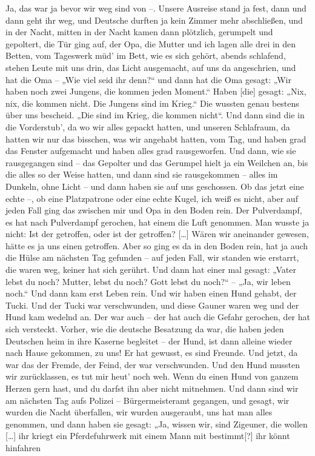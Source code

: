 \documentclass[ngerman,]{article}
\begin{document}
\begin{multicols}{3}
\begin{description}
Ja, das war ja bevor wir weg sind von –. Unsere Ausreise stand ja fest,
dann und dann geht ihr weg, und Deutsche durften ja kein Zimmer mehr
abschließen, und in der Nacht, mitten in der Nacht kamen dann plötzlich,
gerumpelt und gepoltert, die Tür ging auf, der Opa, die Mutter und ich
lagen alle drei in den Betten, vom Tageswerk müd' im Bett, wie es sich
gehört, abends schlafend, stehen Leute mit uns drin, das Licht
ausgemacht, auf uns da angeschrien, und hat die Oma – „Wie viel seid ihr
denn?“ und dann hat die Oma gesagt: „Wir haben noch zwei Jungens, die
kommen jeden Moment.“ Haben {[}die{]} gesagt: „Nix, nix, die kommen
nicht. Die Jungens sind im Krieg.“ Die wussten genau bestens über uns
bescheid. „Die sind im Krieg, die kommen nicht“. Und dann sind die in
die Vorderstub', da wo wir alles gepackt hatten, und unseren Schlafraum,
da hatten wir nur das bisschen, was wir angehabt hatten, vom Tag, und
haben grad das Fenster aufgemacht und haben alles grad rausgeworfen. Und
dann, wie sie rausgegangen sind – das Gepolter und das Gerumpel hielt ja
ein Weilchen an, bis die alles so der Weise hatten, und dann sind sie
rausgekommen – alles im Dunkeln, ohne Licht – und dann haben sie auf uns
geschossen. Ob das jetzt eine echte –, ob eine Platzpatrone oder eine
echte Kugel, ich weiß es nicht, aber auf jeden Fall ging das zwischen
mir und Opa in den Boden rein. Der Pulverdampf, es hat nach Pulverdampf
gerochen, hat einem die Luft genommen. Man wusste ja nicht: Ist der
getroffen, oder ist der getroffen? {[}\ldots{}{]} Wären wir aneinander
gewesen, hätte es ja uns einen getroffen. Aber so ging es da in den
Boden rein, hat ja auch die Hülse am nächsten Tag gefunden – auf jeden
Fall, wir standen wie erstarrt, die waren weg, keiner hat sich gerührt.
Und dann hat einer mal gesagt: „Vater lebst du noch? Mutter, lebst du
noch? Gott lebst du noch?“ – „Ja, wir leben noch.“ Und dann kam erst
Leben rein. Und wir haben einen Hund gehabt, der Tucki. Und der Tucki
war verschwunden, und diese Gauner waren weg und der Hund kam wedelnd
an. Der war auch – der hat auch die Gefahr gerochen, der hat sich
versteckt. Vorher, wie die deutsche Besatzung da war, die haben jeden
Deutschen heim in ihre Kaserne begleitet – der Hund, ist dann alleine
wieder nach Hause gekommen, zu uns! Er hat gewusst, es sind Freunde. Und
jetzt, da war das der Fremde, der Feind, der war verschwunden. Und den
Hund mussten wir zurücklassen, es tut mir heut' noch weh. Wenn du einen
Hund von ganzem Herzen gern hast, und du darfst ihn aber nicht
mitnehmen. Und dann sind wir am nächsten Tag aufs Polizei –
Bürgermeisteramt gegangen, und gesagt, wir wurden die Nacht überfallen,
wir wurden ausgeraubt, uns hat man alles genommen, und dann haben sie
gesagt: „Ja, wissen wir, sind Zigeuner, die wollen {[}\ldots{}{]} ihr
kriegt ein Pferdefuhrwerk mit einem Mann mit bestimmt{[}?{]} ihr könnt
hinfahren
\end{description}


\end{multicols}
\end{document}
